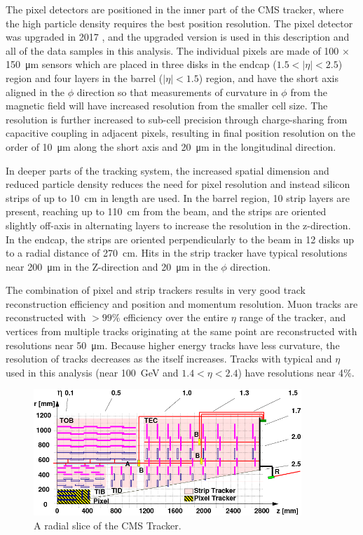 The pixel detectors are positioned in the inner part of the CMS tracker, where the high particle density requires the best position resolution. 
The pixel detector was upgraded in 2017 \cite{pixelUpgrade}, and the upgraded version is used in this description and all of the data samples in this analysis. 
The individual pixels are made of 100 $\times$ \SI{150}{\micro\meter} sensors which are placed in three disks in the endcap ($1.5<\lvert\eta\rvert<2.5$) region and four layers in the barrel ($\lvert\eta\rvert<1.5$) region, and have the short axis aligned in the $\phi$ direction so that measurements of curvature in $\phi$ from the magnetic field will have increased resolution from the smaller cell size. 
The resolution is further increased to sub-cell precision through charge-sharing from capacitive coupling in adjacent pixels, resulting in final position resolution on the order of \SI{10}{\micro\meter} along the short axis and \SI{20}{\micro\meter} in the longitudinal direction.

In deeper parts of the tracking system, the increased spatial dimension and reduced particle density reduces the need for pixel resolution and instead silicon strips of up to \SI{10}{\centi\meter} in length are used. 
In the barrel region, 10 strip layers are present, reaching up to \SI{110}{\centi\meter} from the beam, and the strips are oriented slightly off-axis in alternating layers to increase the resolution in the z-direction. 
In the endcap, the strips are oriented perpendicularly to the beam in 12 disks up to a radial distance of \SI{270}{\centi\meter}.
Hits in the strip tracker have typical resolutions near \SI{200}{\micro\meter} in the Z-direction and \SI{20}{\micro\meter} in the $\phi$ direction.

The combination of pixel and strip trackers results in very good track reconstruction efficiency and position and momentum resolution.
Muon tracks are reconstructed with $>99\%$ efficiency over the entire $\eta$ range of the tracker, and vertices from multiple tracks originating at the same point are reconstructed with resolutions near \SI{50}{\micro\meter}.
Because higher energy tracks have less curvature, the \pt resolution of tracks decreases as the \pt itself increases. Tracks with typical \pt and $\eta$ used in this analysis (\pt near \SI{100}{\giga\eV} and $1.4<\eta<2.4$) have resolutions near 4$\%$. 

\begin{figure}[h]
    \includegraphics[width=0.9\textwidth]{figures/cms_tracker.png}
    \centering
    \caption{A radial slice of the CMS Tracker.}
    \label{fig:cmsTracker}
\end{figure}


